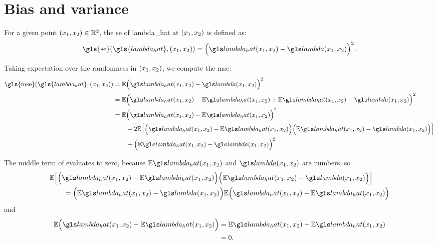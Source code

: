 

\section{Bias and variance}
\label{sec:derivations:biasvariance}

For a given point $(x_1, x_2) \in \mathbb{R}^2$,
the \gls{se} of \gls{lambda_hat} at $(x_1, x_2)$ is defined as:
\begin{equation}
    \mbox{\gls{se}}(\gls{lambda_hat}, \xvec) = \Big(\lmbdhat - \lmbd \Big)^2 \text{.}
\end{equation}

Taking expectation over the randomness in $(x_1, x_2)$, we compute the \gls{mse}:
\begin{align}
    \mbox{\gls{mse}}(\gls{lambda_hat}, \xvec)
        & = \E \Big(\lmbdhat - \lmbd \Big)^2 \nonumber \\
        & = \E \Big(\lmbdhat - \E\lmbdhat + \E\lmbdhat - \lmbd \Big)^2 \nonumber \\
        & = \E \Big( \lmbdhat - \E\lmbdhat \Big)^2 \nonumber \\
        &    \qquad + 2 \E \Big[ \Big( \lmbdhat - \E\lmbdhat \Big) \Big( \E\lmbdhat - \lmbd \Big) \Big] \nonumber \\
        &    \qquad + \Big( \E\lmbdhat - \lmbd \Big)^2 \label{eq:mse:expanded}
\end{align}

The middle term of  evaluates to zero,
because $\E\lmbdhat$ and $\lmbd$ are numbers,
so
\begin{equation*}\begin{split}
    & \E \Big[ \Big( \lmbdhat - \E\lmbdhat \Big) \Big( \E\lmbdhat - \lmbd \Big) \Big] \\
    &    \qquad = \Big( \E\lmbdhat - \lmbd \Big) \E \Big( \lmbdhat - \E\lmbdhat \Big)
\end{split}\end{equation*}
and
\begin{equation*}\begin{split}
    \E \Big( \lmbdhat - \E\lmbdhat \Big) \nonumber & = \E \lmbdhat - \E\lmbdhat \\
        & = 0 \text{.}
\end{split}\end{equation*}

